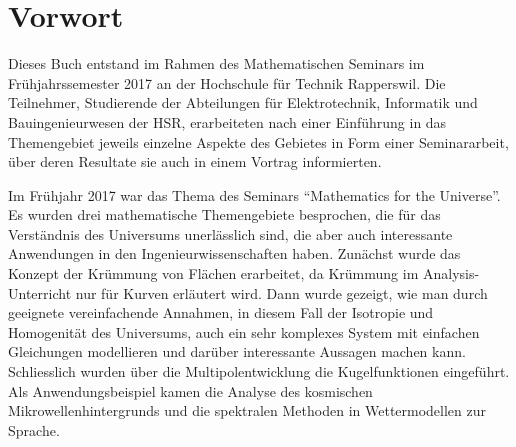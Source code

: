 %
%
%
\chapter*{Vorwort}
\rhead{}
Dieses Buch entstand im Rahmen des Mathematischen Seminars
im Frühjahrssemester 2017 an der Hochschule für Technik Rapperswil.
Die Teilnehmer, Studierende der Abteilungen für Elektrotechnik,
Informatik und Bauingenieurwesen der
HSR, erarbeiteten nach einer Einführung in das Themengebiet jeweils
einzelne Aspekte des Gebietes in Form einer Seminararbeit, über
deren Resultate sie auch in einem Vortrag informierten. 

Im Frühjahr 2017 war das Thema des Seminars ``Mathematics for
the Universe''.
Es wurden drei mathematische Themengebiete besprochen, die für
das Verständnis des Universums unerlässlich sind, die aber auch
interessante Anwendungen in den Ingenieurwissenschaften haben.
Zunächst wurde das Konzept der Krümmung von Flächen erarbeitet,
da Krümmung im Analysis-Unterricht nur für Kurven erläutert wird.
Dann wurde gezeigt, wie man durch geeignete vereinfachende Annahmen,
in diesem Fall der Isotropie und Homogenität des Universums, auch
ein sehr komplexes System mit einfachen Gleichungen modellieren
und darüber interessante Aussagen machen kann.
Schliesslich wurden über die Multipolentwicklung die Kugelfunktionen
eingeführt.
Als Anwendungsbeispiel kamen die Analyse des kosmischen Mikrowellenhintergrunds
und die spektralen Methoden in Wettermodellen zur Sprache.

%
%
%

